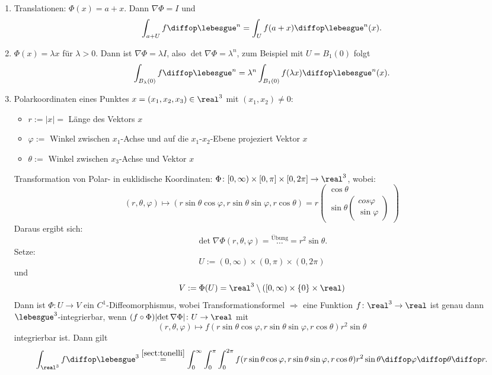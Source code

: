\begin{exmp}
 \begin{enumerate}
  \item Translationen: $\Phi(x) = a + x$. Dann $\nabla \Phi = I$ und 
  \[ \int_{a+U} f \diffop \lebesgue^n = \int_U f(a+x) \diffop \lebesgue^n(x). \]
  \item $\Phi(x) = \lambda x$ für $\lambda > 0$. Dann ist $\nabla \Phi = \lambda I$, also $\det \nabla \Phi = \lambda^n$, zum Beispiel mit $U = B_1(0)$ folgt
  \[ \int_{B_\lambda(0)} f \diffop \lebesgue^n = \lambda^n \int_{B_1(0)} f(\lambda x) \diffop \lebesgue^n(x). \]
  \item Polarkoordinaten eines Punktes $x=(x_1,x_2,x_3) \in \real^3$ mit $(x_1,x_2) \ne 0$:
   \begin{itemize}
    \item $r := |x| =$ Länge des Vektors $x$
    \item $\varphi :=$ Winkel zwischen $x_1$-Achse und auf die $x_1$-$x_2$-Ebene  projeziert Vektor $x$
    \item $\theta :=$ Winkel zwischen $x_3$-Achse und Vektor $x$
   \end{itemize}
   Transformation von Polar- in euklidische Koordinaten: $\Phi\colon[0, \infty) \times [0,\pi] \times [0,2\pi] \to \real^3$, wobei:
   \[ (r,\theta, \varphi) \mapsto ( r \sin \theta \cos \varphi, r \sin \theta \sin \varphi, r \cos \theta )=r\left( \begin{matrix} \cos \theta \\ \sin\theta \left(\begin{matrix} cos \varphi \\ \sin \varphi \end{matrix}\right) \end{matrix} \right) \]
   Daraus ergibt sich:
   \[ \det \nabla \Phi( r, \theta, \varphi) = { \stackrel{\text{Übung}}\ldots} = r^2 \sin \theta. \]
   Setze: 
   \[ U := (0, \infty) \times (0,\pi) \times (0,2\pi) \]
   und
   \[ V := \Phi(U) = \real^3 \setminus ( [0,\infty) \times \{ 0 \} \times \real ) \]
   Dann ist $\Phi\colon U \to V$ ein $C^1$-Diffeomorphismus, wobei
   Transformationsformel $\Rightarrow$ eine Funktion $f\colon \real^3 \to \real$ ist genau dann $\lebesgue^3$-integrierbar, wenn $(f \circ \Phi) \lvert \det \nabla \Phi \rvert \colon U \to \real$ mit
   \[ (r, \theta, \varphi) \mapsto f( r \sin \theta \cos \varphi, r \sin \theta \sin \varphi, r \cos \theta ) r^2 \sin \theta \]
   integrierbar ist. Dann gilt
   \[ \int_{\real^3} f \diffop \lebesgue^3 \stackrel{\mathrm{\ref{sect:tonelli}}}= \int_0^\infty \int_0^\pi \int_0^{2 \pi} f( r \sin \theta \cos \varphi, r \sin \theta \sin \varphi, r \cos \theta ) r^2 \sin \theta \diffop \varphi \diffop \theta \diffop r. \]
   

\end{enumerate}
\end{exmp}
